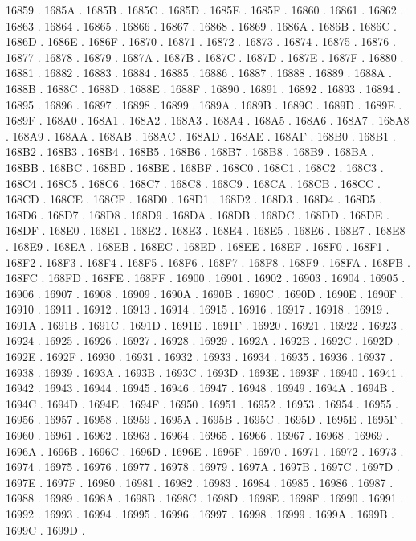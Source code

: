 16859 .
1685A .
1685B .
1685C .
1685D .
1685E .
1685F .
16860 .
16861 .
16862 .
16863 .
16864 .
16865 .
16866 .
16867 .
16868 .
16869 .
1686A .
1686B .
1686C .
1686D .
1686E .
1686F .
16870 .
16871 .
16872 .
16873 .
16874 .
16875 .
16876 .
16877 .
16878 .
16879 .
1687A .
1687B .
1687C .
1687D .
1687E .
1687F .
16880 .
16881 .
16882 .
16883 .
16884 .
16885 .
16886 .
16887 .
16888 .
16889 .
1688A .
1688B .
1688C .
1688D .
1688E .
1688F .
16890 .
16891 .
16892 .
16893 .
16894 .
16895 .
16896 .
16897 .
16898 .
16899 .
1689A .
1689B .
1689C .
1689D .
1689E .
1689F .
168A0 .
168A1 .
168A2 .
168A3 .
168A4 .
168A5 .
168A6 .
168A7 .
168A8 .
168A9 .
168AA .
168AB .
168AC .
168AD .
168AE .
168AF .
168B0 .
168B1 .
168B2 .
168B3 .
168B4 .
168B5 .
168B6 .
168B7 .
168B8 .
168B9 .
168BA .
168BB .
168BC .
168BD .
168BE .
168BF .
168C0 .
168C1 .
168C2 .
168C3 .
168C4 .
168C5 .
168C6 .
168C7 .
168C8 .
168C9 .
168CA .
168CB .
168CC .
168CD .
168CE .
168CF .
168D0 .
168D1 .
168D2 .
168D3 .
168D4 .
168D5 .
168D6 .
168D7 .
168D8 .
168D9 .
168DA .
168DB .
168DC .
168DD .
168DE .
168DF .
168E0 .
168E1 .
168E2 .
168E3 .
168E4 .
168E5 .
168E6 .
168E7 .
168E8 .
168E9 .
168EA .
168EB .
168EC .
168ED .
168EE .
168EF .
168F0 .
168F1 .
168F2 .
168F3 .
168F4 .
168F5 .
168F6 .
168F7 .
168F8 .
168F9 .
168FA .
168FB .
168FC .
168FD .
168FE .
168FF .
16900 .
16901 .
16902 .
16903 .
16904 .
16905 .
16906 .
16907 .
16908 .
16909 .
1690A .
1690B .
1690C .
1690D .
1690E .
1690F .
16910 .
16911 .
16912 .
16913 .
16914 .
16915 .
16916 .
16917 .
16918 .
16919 .
1691A .
1691B .
1691C .
1691D .
1691E .
1691F .
16920 .
16921 .
16922 .
16923 .
16924 .
16925 .
16926 .
16927 .
16928 .
16929 .
1692A .
1692B .
1692C .
1692D .
1692E .
1692F .
16930 .
16931 .
16932 .
16933 .
16934 .
16935 .
16936 .
16937 .
16938 .
16939 .
1693A .
1693B .
1693C .
1693D .
1693E .
1693F .
16940 .
16941 .
16942 .
16943 .
16944 .
16945 .
16946 .
16947 .
16948 .
16949 .
1694A .
1694B .
1694C .
1694D .
1694E .
1694F .
16950 .
16951 .
16952 .
16953 .
16954 .
16955 .
16956 .
16957 .
16958 .
16959 .
1695A .
1695B .
1695C .
1695D .
1695E .
1695F .
16960 .
16961 .
16962 .
16963 .
16964 .
16965 .
16966 .
16967 .
16968 .
16969 .
1696A .
1696B .
1696C .
1696D .
1696E .
1696F .
16970 .
16971 .
16972 .
16973 .
16974 .
16975 .
16976 .
16977 .
16978 .
16979 .
1697A .
1697B .
1697C .
1697D .
1697E .
1697F .
16980 .
16981 .
16982 .
16983 .
16984 .
16985 .
16986 .
16987 .
16988 .
16989 .
1698A .
1698B .
1698C .
1698D .
1698E .
1698F .
16990 .
16991 .
16992 .
16993 .
16994 .
16995 .
16996 .
16997 .
16998 .
16999 .
1699A .
1699B .
1699C .
1699D .
